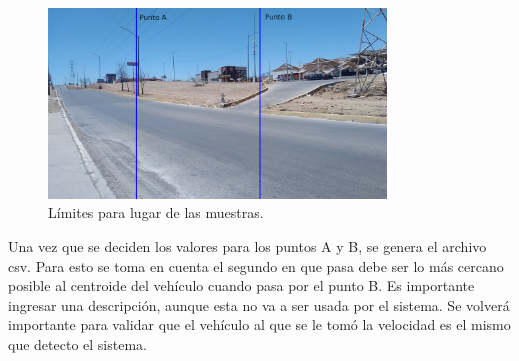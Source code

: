 \begin{figure}[H]
    \centering
    \includegraphics[width=0.8\textwidth]{Metodologia/imgs/LugarLimites_01.jpg}
    \caption{Límites para lugar de las muestras.}
    \label{fig:LugarLimites}
\end{figure}

Una vez que se deciden los valores para los puntos A y B, se genera el archivo csv. Para esto se toma en cuenta el segundo en que pasa debe ser lo más cercano posible al centroide del vehículo cuando pasa por el punto B. Es importante ingresar una descripción, aunque esta no va a ser usada por el sistema. Se volverá importante para validar que el vehículo al que se le tomó la velocidad es el mismo que detecto el sistema.


